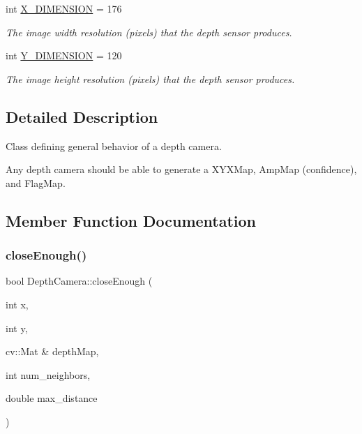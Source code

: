 \begin{DoxyCompactItemize}
\hypertarget{class_depth_camera_a6e72272880679c710fb4aaeedf1d8309}{}\label{class_depth_camera_a6e72272880679c710fb4aaeedf1d8309} 
int \hyperlink{class_depth_camera_a6e72272880679c710fb4aaeedf1d8309}{X\+\_\+\+D\+I\+M\+E\+N\+S\+I\+ON} = 176
\begin{DoxyCompactList}\small\item\em The image width resolution (pixels) that the depth sensor produces. \end{DoxyCompactList}\item 
\hypertarget{class_depth_camera_a9c69a2e4d68fc09737317a638ad71f4a}{}\label{class_depth_camera_a9c69a2e4d68fc09737317a638ad71f4a} 
int \hyperlink{class_depth_camera_a9c69a2e4d68fc09737317a638ad71f4a}{Y\+\_\+\+D\+I\+M\+E\+N\+S\+I\+ON} = 120
\begin{DoxyCompactList}\small\item\em The image height resolution (pixels) that the depth sensor produces. \end{DoxyCompactList}\end{DoxyCompactItemize}


\subsection{Detailed Description}
Class defining general behavior of a depth camera. 

Any depth camera should be able to generate a X\+Y\+X\+Map, Amp\+Map (confidence), and Flag\+Map. 

\subsection{Member Function Documentation}
\hypertarget{class_depth_camera_ab24ac78c2cf29b0410c3d5e0dfc9a243}{}\label{class_depth_camera_ab24ac78c2cf29b0410c3d5e0dfc9a243} 
\subsubsection{\texorpdfstring{close\+Enough()}{closeEnough()}}
{\footnotesize\ttfamily bool Depth\+Camera\+::close\+Enough (\begin{DoxyParamCaption}\item[{int}]{x,  }\item[{int}]{y,  }\item[{cv\+::\+Mat \&}]{depth\+Map,  }\item[{int}]{num\+\_\+neighbors,  }\item[{double}]{max\+\_\+distance }\end{DoxyParamCaption})\hspace{0.3cm}{\ttfamily [protected]}}



